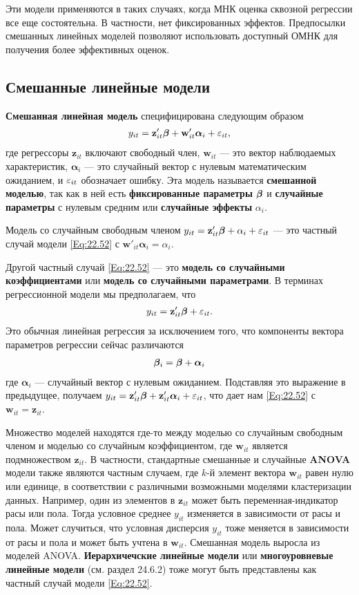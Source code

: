 Эти модели применяются в таких случаях, когда МНК оценка сквозной регрессии все еще состоятельна. В частности, нет фиксированных эффектов.  Предпосылки смешанных линейных моделей позволяют использовать доступный ОМНК для получения более эффективных оценок.

 \subsection{Смешанные линейные модели}

\textbf{Смешанная линейная модель} специфицирована следующим образом
 \begin{align}
y_{it}=\mathbf z'_{it} \bm{\beta} + \mathbf w'_{it} \bm\alpha_i + \varepsilon_{it},
\label{Eq:22.52}
\end{align}
где регрессоры $\mathbf z_{it}$ включают свободный член, $\mathbf w_{it}$  --- это вектор наблюдаемых характеристик, $\bm\alpha_i$  --- это случайный вектор с нулевым математическим ожиданием, и $\varepsilon_{it}$ обозначает ошибку. Эта модель называется \textbf{смешанной моделью}, так как в ней есть \textbf{фиксированные параметры} $\bm{\beta}$ и  \textbf{случайные параметры} с нулевым средним  или \textbf{случайные эффекты} $\alpha_i$.

Модель со случайным свободным членом $y_{it}=\mathbf z'_{it}\bm{\beta}+\alpha_i+\varepsilon_{it}$ --- это частный случай модели \ref{Eq:22.52}  с $\mathbf w'_{it} \bm\alpha_i=\alpha_i$.

Другой частный случай \ref{Eq:22.52} --- это \textbf{модель со случайными коэффициентами} или \textbf{модель со случайными параметрами}. В терминах регрессионной модели мы предполагаем, что
 \begin{align}
y_{it}=\mathbf z'_{it} \bm{\beta} + \varepsilon_{it}.
\nonumber
\end{align}
Это обычная линейная регрессия за исключением того, что компоненты вектора параметров регрессии сейчас различаются 
 \begin{align}
\bm{\beta}_i=\bm{\beta}+\bm\alpha_i
\nonumber
\end{align}
где $\bm\alpha_i$ --- случайный вектор с нулевым ожиданием. Подставляя это выражение в предыдущее, получаем $y_{it}=\mathbf z'_{it} \bm{\beta} + \mathbf z'_{it} \bm\alpha_i+\varepsilon_{it}$, что дает нам \ref{Eq:22.52} с $\mathbf w_{it}=\mathbf z_{it}$.

Множество моделей находятся где-то между моделью со случайным свободным членом и моделью со случайным коэффициентом, где $\mathbf w_{it}$ является подмножеством $\mathbf z_{it}$. В частности,  стандартные смешанные и случайные \textbf{ANOVA} модели также являются частным случаем, где $k$-й элемент вектора $\mathbf w_{it}$ равен нулю или единице, в соответствии с различными возможными моделями кластеризации данных. Например, один из элементов в $\mathbf z_{it}$ может быть переменная-индикатор расы или пола. Тогда условное среднее $y_{it}$ изменяется в зависимости от расы и пола. Может случиться, что условная дисперсия $y_{it}$ тоже меняется в зависимости от расы и пола и может быть учтена  в $\mathbf w_{it}$. Смешанная модель выросла из моделей ANOVA. \textbf{Иерархичечские линейные модели} или \textbf{многоуровневые линейные модели} (см. раздел 24.6.2) тоже могут быть представлены как частный случай модели \ref{Eq:22.52}. 

